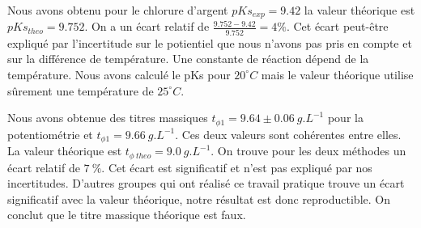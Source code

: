 \documentclass[12pt]{article}
\begin{document}
Nous avons obtenu pour le chlorure d'argent $pKs_{exp}=9.42$ la valeur théorique est $pKs_{theo}=9.752$. 
On a un écart relatif de $\frac{9.752-9.42}{9.752}= 4 \%$. 
Cet écart peut-être expliqué par l'incertitude sur le potientiel que nous n'avons pas pris en compte et sur la différence de température.
Une constante de réaction dépend de la température. 
Nous avons calculé le pKs pour $20^\circ C$ mais le valeur théorique utilise sûrement une température de $25^\circ C$.

Nous avons obtenue des titres massiques $t_{\phi 1}= 9.64 \pm 0.06 \ g.L^{-1}$ pour la potentiométrie et $t_{\phi 1}= 9.66 \ g.L^{-1}$.
Ces deux valeurs sont cohérentes entre elles. 
La valeur théorique est $t_{\phi \ theo}= 9.0 \ g.L^{-1}$.
On trouve pour les deux méthodes un écart relatif de $7\ \%$.
Cet écart est significatif et n'est pas expliqué par nos incertitudes.
D'autres groupes qui ont réalisé ce travail pratique trouve un écart significatif avec la valeur théorique, notre résultat est donc reproductible.
On conclut que le titre massique théorique est faux. 
\end{document}
